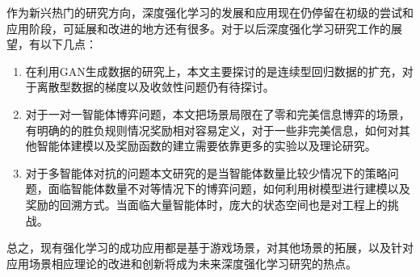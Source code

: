 作为新兴热门的研究方向，深度强化学习的发展和应用现在仍停留在初级的尝试和应用阶段，可延展和改进的地方还有很多。对于以后深度强化学习研究工作的展望，有以下几点：
\begin{enumerate}
	\item 在利用GAN生成数据的研究上，本文主要探讨的是连续型回归数据的扩充，对于离散型数据的梯度以及收敛性问题仍有待探讨。
	\item 对于一对一智能体博弈问题，本文把场景局限在了零和完美信息博弈的场景，有明确的的胜负规则情况奖励相对容易定义，对于一些非完美信息，如何对其他智能体建模以及奖励函数的建立需要依靠更多的实验以及理论研究。
	\item 对于多智能体对抗的问题本文研究的是当智能体数量比较少情况下的策略问题，面临智能体数量不对等情况下的博弈问题，如何利用树模型进行建模以及奖励的回溯方式。当面临大量智能体时，庞大的状态空间也是对工程上的挑战。
\end{enumerate}

总之，现有强化学习的成功应用都是基于游戏场景，对其他场景的拓展，以及针对应用场景相应理论的改进和创新将成为未来深度强化学习研究的热点。